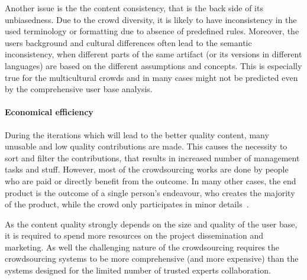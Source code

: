 \documentclass[ngerman,UKenglish,table]{scrbook}
\begin{document}
Another issue is the the content consistency, that is the back side of its unbiasedness. 
Due to the crowd diversity, it is likely to have inconsistency in the used terminology or formatting due to absence of predefined rules.
Moreover, the users background and cultural differences often lead to the semantic inconsistency, when different parts of the same artifact (or its versions in different languages) are based on the different assumptions and concepts.  
This is especially true for the multicultural crowds and in many cases might not be predicted even by the comprehensive user base analysis. 
  

%
%
%


\paragraph{Economical efficiency}

During the iterations which will lead to the better quality content, many unusable and low quality contributions are made.
This causes the necessity to sort and filter the contributions, that results in increased number of management tasks and stuff. 
However, most of the crowdsourcing works are done by people who are paid or directly benefit from the outcome.
In many other cases, the end product is the outcome of a single person's endeavour, who creates the majority of the product, while the crowd only participates in minor details~\cite{woods2009myth}.

As the content quality  strongly depends on the size and quality of the user base, it is required to spend more resources on the project dissemination and marketing. 
As well the challenging nature of the crowdsourcing requires the crowdsourcing systems to be more comprehensive (and more expensive) than the systems designed for the limited number of trusted experts collaboration.
\end{document}
